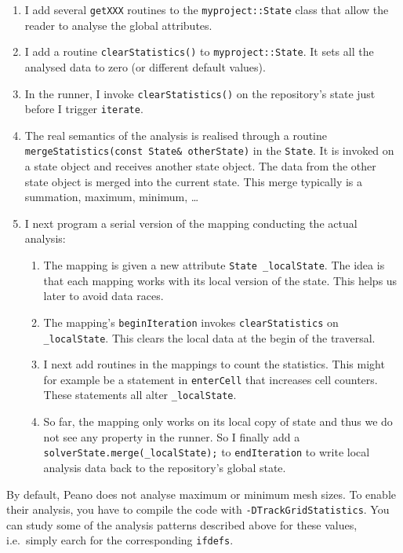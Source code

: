 \begin{enumerate}
  \item I add several \texttt{getXXX} routines to the \texttt{myproject::State}
  class that allow the reader to analyse the global attributes. 
  \item I add a routine \texttt{clearStatistics()} to \texttt{myproject::State}.
  It sets all the analysed data to zero (or different default values).
  \item In the runner, I invoke \texttt{clearStatistics()} on the repository's
  state just before I trigger \texttt{iterate}.
  \item The real semantics of the analysis is realised through a routine
  \texttt{mergeStatistics(const State\& otherState)} in the \texttt{State}. It
  is invoked on a state object and receives another state object. The data from the
  other state object is merged into the current state. This merge typically is a
  summation, maximum, minimum, \ldots
  \item I next program a serial version of the mapping conducting the actual
  analysis:
  \begin{enumerate}
    \item The mapping is given a new attribute \texttt{State \_localState}. The
    idea is that each mapping works with its local version of the state. This
    helps us later to avoid data races.
    \item The mapping's \texttt{beginIteration} invokes
    \texttt{clearStatistics} on \texttt{\_localState}. This clears the local
    data at the begin of the traversal.
    \item I next add routines in the mappings to count the statistics. This
    might for example be a statement in \texttt{enterCell} that increases cell
    counters. These statements all alter \texttt{\_localState}. 
    \item So far, the mapping only works on its local copy of state and thus we
    do not see any property in the runner. So I finally add a
    \texttt{solverState.merge(\_localState);} to \texttt{endIteration} to write
    local analysis data back to the repository's global state.
  \end{enumerate}
\end{enumerate}


\noindent
By default, Peano does not analyse maximum or minimum mesh sizes. To enable
their analysis, you have to compile the code with
\texttt{-DTrackGridStatistics}. You can study some of the analysis patterns
described above for these values, i.e.~simply earch for the corresponding
\texttt{ifdefs}.


